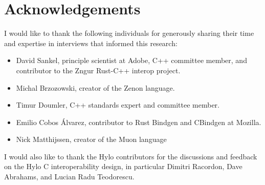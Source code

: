 \section*{Acknowledgements}
I would like to thank the following individuals for generously sharing their time and expertise in interviews that informed this research:
\begin{itemize}
    \item David Sankel, principle scientist at Adobe, C++ committee member, and contributor to the Zngur Rust-C++ interop project\cite{zngur}.
    \item Michal Brzozowski, creator of the Zenon language\cite{zenon-lang}.
    \item Timur Doumler, C++ standards expert and committee member.
    \item Emilio Cobos Álvarez, contributor to Rust Bindgen\cite{rust-bindgen} and CBindgen\cite{cbindgen} at Mozilla.
    \item Nick Matthijssen, creator of the Muon language
\end{itemize}
I would also like to thank the Hylo contributors for the discussions and feedback on the Hylo C interoperability design, in particular Dimitri Racordon, Dave Abrahams, and Lucian Radu Teodorescu.